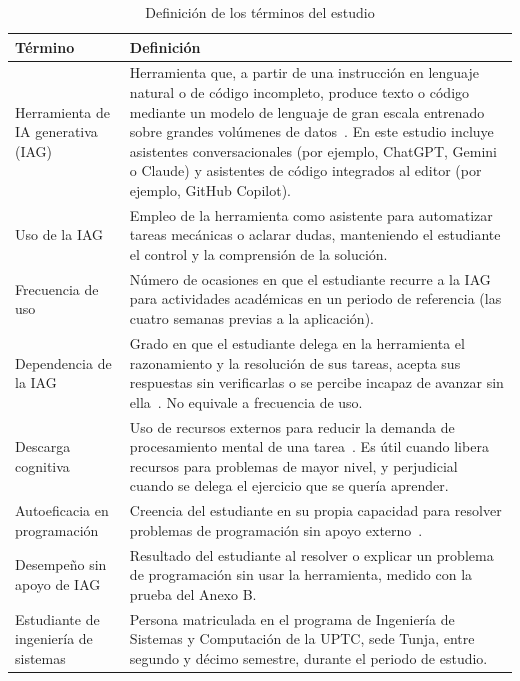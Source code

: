 \documentclass[12pt,letterpaper]{article}
\numberwithin{table}{section}
\numberwithin{figure}{section}
\begin{document}
\begin{table}[ht]
\centering
\caption{Definición de los términos del estudio}
\label{tab:marco_conceptual}
\footnotesize
\begin{tabular}{@{}p{3.4cm}p{9.2cm}@{}}
\toprule
\textbf{Término} & \textbf{Definición} \\
\midrule
Herramienta de IA generativa (IAG) & Herramienta que, a partir de una instrucción en lenguaje natural o de código incompleto, produce texto o código mediante un modelo de lenguaje de gran escala entrenado sobre grandes volúmenes de datos~\cite{chen2021evaluating}. En este estudio incluye asistentes conversacionales (por ejemplo, ChatGPT, Gemini o Claude) y asistentes de código integrados al editor (por ejemplo, GitHub Copilot). \\
\addlinespace
Uso de la IAG & Empleo de la herramienta como asistente para automatizar tareas mecánicas o aclarar dudas, manteniendo el estudiante el control y la comprensión de la solución. \\
\addlinespace
Frecuencia de uso & Número de ocasiones en que el estudiante recurre a la IAG para actividades académicas en un periodo de referencia (las cuatro semanas previas a la aplicación). \\
\addlinespace
Dependencia de la IAG & Grado en que el estudiante delega en la herramienta el razonamiento y la resolución de sus tareas, acepta sus respuestas sin verificarlas o se percibe incapaz de avanzar sin ella~\cite{moralesgarcia2024development,risko2016cognitive,parasuraman2010complacency}. No equivale a frecuencia de uso. \\
\addlinespace
Descarga cognitiva & Uso de recursos externos para reducir la demanda de procesamiento mental de una tarea~\cite{risko2016cognitive}. Es útil cuando libera recursos para problemas de mayor nivel, y perjudicial cuando se delega el ejercicio que se quería aprender. \\
\addlinespace
Autoeficacia en programación & Creencia del estudiante en su propia capacidad para resolver problemas de programación sin apoyo externo~\cite{bandura1977self,ramalingam1998development}. \\
\addlinespace
Desempeño sin apoyo de IAG & Resultado del estudiante al resolver o explicar un problema de programación sin usar la herramienta, medido con la prueba del Anexo B. \\
\addlinespace
Estudiante de ingeniería de sistemas & Persona matriculada en el programa de Ingeniería de Sistemas y Computación de la UPTC, sede Tunja, entre segundo y décimo semestre, durante el periodo de estudio. \\
\bottomrule
\end{tabular}
\end{table}
\end{document}
